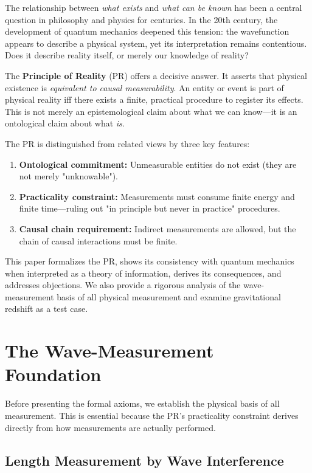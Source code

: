 \documentclass[aps,preprint,showpacs,showkeys]{revtex4}%
\begin{document}
The relationship between \emph{what exists} and \emph{what can be known} has
been a central question in philosophy and physics for centuries. In the 20th
century, the development of quantum mechanics deepened this tension: the
wavefunction appears to describe a physical system, yet its interpretation
remains contentious. Does it describe reality itself, or merely our
knowledge of reality?

The \textbf{Principle of Reality} (PR) offers a decisive answer. It asserts
that physical existence is \emph{equivalent to causal measurability}. An
entity or event is part of physical reality iff there exists a finite,
practical procedure to register its effects. This is not merely an
epistemological claim about what we can know---it is an ontological claim
about what \emph{is}.

The PR is distinguished from related views by three key features:

\begin{enumerate}
\item \textbf{Ontological commitment:} Unmeasurable entities do not exist
(they are not merely "unknowable").

\item \textbf{Practicality constraint:} Measurements must consume finite
energy and finite time---ruling out "in principle but never in practice"
procedures.

\item \textbf{Causal chain requirement:} Indirect measurements are allowed,
but the chain of causal interactions must be finite.
\end{enumerate}

This paper formalizes the PR, shows its consistency with quantum mechanics
when interpreted as a theory of information, derives its consequences, and
addresses objections. We also provide a rigorous analysis of the
wave-measurement basis of all physical measurement and examine gravitational
redshift as a test case.

\section{The Wave-Measurement Foundation}

Before presenting the formal axioms, we establish the physical basis of all
measurement. This is essential because the PR's practicality constraint
derives directly from how measurements are actually performed.

\subsection{Length Measurement by Wave Interference}
\end{document}
